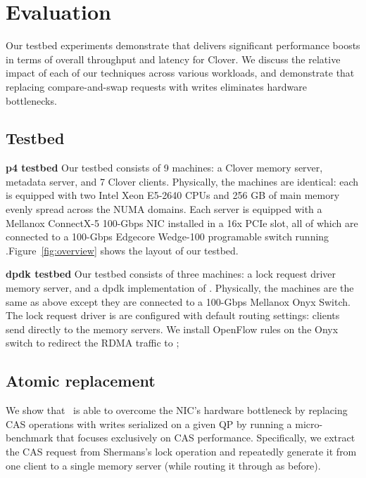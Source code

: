 \section{Evaluation}
\label{s:results}

Our testbed experiments demonstrate that {\sword} delivers significant
performance boosts in terms of overall throughput and latency for
Clover. We discuss the relative impact of each of our techniques across
various workloads, and demonstrate that replacing compare-and-swap
requests with writes eliminates hardware bottlenecks.

\subsection{Testbed} 

\textbf{p4 testbed} Our testbed consists of 9 machines: a Clover memory server,
metadata server, and 7 Clover clients. Physically, the machines are identical:
each is equipped with two Intel Xeon E5-2640 CPUs and 256 GB of main memory
evenly spread across the NUMA domains. Each server is equipped with a Mellanox
ConnectX-5 100-Gbps NIC installed in a 16x PCIe slot, all of which are connected
to a 100-Gbps Edgecore Wedge-100 programable switch running
\sword.Figure~\ref{fig:overview} shows the layout of our testbed.


\textbf{dpdk testbed} Our testbed consists of three machines: a lock request
driver memory server, and a dpdk implementation of {\sword}.  Physically, the
machines are the same as above except they are connected to a 100-Gbps Mellanox
Onyx Switch. The lock request driver is are configured with default routing
settings: clients send directly to the memory servers. We install OpenFlow rules
on the Onyx switch to redirect the RDMA traffic to \sword; 

\subsection{Atomic replacement}

We show that \sword\ is able to overcome the NIC's hardware bottleneck
by replacing CAS operations with writes serialized on a given QP by
running a micro-benchmark that focuses exclusively on CAS
performance. Specifically, we extract the CAS request from
Shermans's lock operation and repeatedly generate it from one client
to a single memory server (while routing it through {\sword} as
before).


